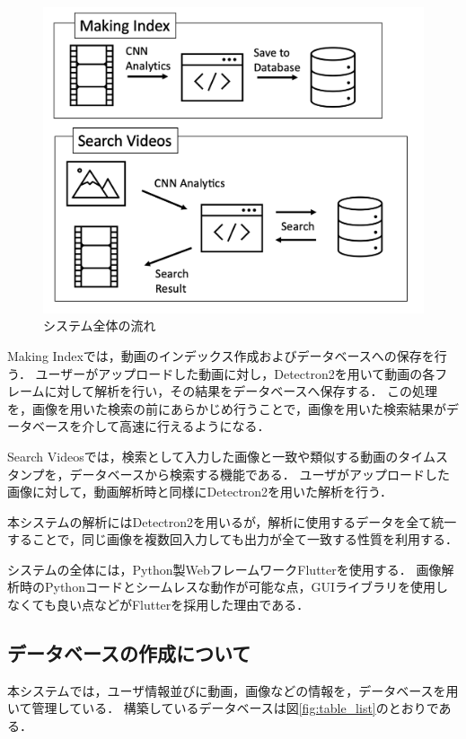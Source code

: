\documentclass[a4j,12pt,dvipdfmx]{jreport}
\begin{document}
\begin{figure}[t]
  \centering
  \includegraphics[width=13cm]{image/flow.png}
  \caption{システム全体の流れ}
  \label{fig:flow}
\end{figure}

Making Indexでは，動画のインデックス作成およびデータベースへの保存を行う．
ユーザーがアップロードした動画に対し，Detectron2を用いて動画の各フレームに対して解析を行い，その結果をデータベースへ保存する．
この処理を，画像を用いた検索の前にあらかじめ行うことで，画像を用いた検索結果がデータベースを介して高速に行えるようになる．

Search Videosでは，検索として入力した画像と一致や類似する動画のタイムスタンプを，データベースから検索する機能である．
ユーザがアップロードした画像に対して，動画解析時と同様にDetectron2を用いた解析を行う．

本システムの解析にはDetectron2を用いるが，解析に使用するデータを全て統一することで，同じ画像を複数回入力しても出力が全て一致する性質を利用する．

システムの全体には，Python製WebフレームワークFlutterを使用する．
画像解析時のPythonコードとシームレスな動作が可能な点，GUIライブラリを使用しなくても良い点などがFlutterを採用した理由である．

\subsection{データベースの作成について}\label{chap3-3-1}
本システムでは，ユーザ情報並びに動画，画像などの情報を，データベースを用いて管理している．
構築しているデータベースは図\ref{fig:table_list}のとおりである．
\end{document}
